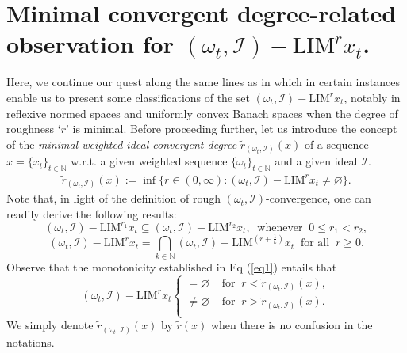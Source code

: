 \documentclass[reqno]{amsart}
\begin{document}
{\section{Minimal convergent degree-related observation for $(\omega_t,\mathcal{I})-\text{LIM}^{r} x_t$.}\label{sec 3}
Here, we continue our quest along the same lines as in \cite{phu2001rough,xuan2003rough} which in certain instances enable us to present some classifications of the set $(\omega_t,\mathcal{I})-\text{LIM}^{r} x_t$, notably in reflexive normed spaces and uniformly convex Banach spaces when the degree of roughness `$r$' is minimal. Before proceeding further, let us introduce the concept of the \textit{minimal weighted ideal convergent degree} $\tilde{r}_{(\omega_t,\mathcal{I})}(x)$ of a sequence $x=\{x_t\}_{t\in\mathbb{N}}$ w.r.t. a given weighted sequence $\{\omega_t\}_{t\in\mathbb{N}}$ and a given ideal $\mathcal{I}$.
\begin{eqnarray}\label{2}
	\tilde{r}_{(\omega_t,\mathcal{I})}(x):=\inf\{r\in(0,\infty):(\omega_t,\mathcal{I})-\text{LIM}^{r} x_t\neq\varnothing\}.
\end{eqnarray}
Note that, in light of the definition of rough $(\omega_t, \mathcal{I})$-convergence, one can readily derive the following results:
\begin{equation}\label{eq1}
	(\omega_t,\mathcal{I})-\text{LIM}^{r_1} x_t\subseteq (\omega_t,\mathcal{I})-\text{LIM}^{r_2} x_t,~\mbox{ whenever }~ 0\leq r_1<r_2,
\end{equation}
\begin{equation}\label{Cor 2.3}
(\omega_t,\mathcal{I})-\text{LIM}^{r} x_t=\bigcap_{k\in\mathbb{N}} (\omega_t,\mathcal{I})-\text{LIM}^{(r+\frac{1}{k})} x_t ~\mbox{ for all }~r\geq 0.
\end{equation}
Observe that the monotonicity established in Eq (\ref{eq1}) entails that  
\begin{equation}\label{Eqn 2.3}
		(\omega_t,\mathcal{I})-\text{LIM}^{r} x_t
	\begin{cases}
		=\varnothing & \mbox{~for }~r<\tilde{r}_{(\omega_t,\mathcal{I})}(x), \\
		\neq\varnothing & \mbox{~for }~r>\tilde{r}_{(\omega_t,\mathcal{I})}(x).\\
	\end{cases} 
\end{equation}
We simply denote $\tilde{r}_{(\omega_t,\mathcal{I})}(x)$ by $\tilde{r}(x)$ when there is no confusion in the notations.\\



}
\end{document}
